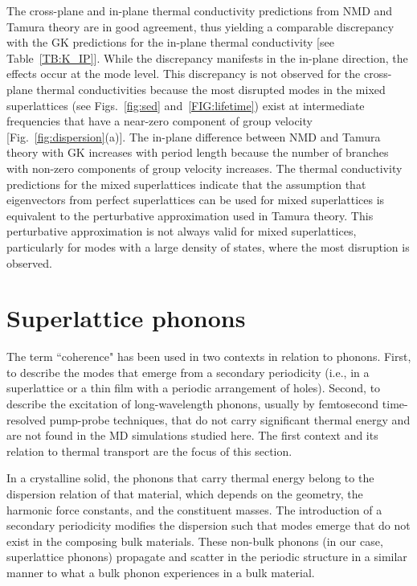 \documentclass[aps,prb,preprint,preprintnumbers,amsmath,amssymb,floatfix,superscriptaddress]{revtex4}
\begin{document}
The cross-plane and in-plane thermal conductivity predictions from NMD and Tamura theory are in good agreement, thus yielding a comparable discrepancy with the GK predictions for the in-plane thermal conductivity [see Table~\ref{TB:K_IP}]. While the discrepancy manifests in the in-plane direction, the effects occur at the mode level. This discrepancy is not observed for the cross-plane thermal conductivities because the most disrupted modes in the mixed superlattices (see Figs.~\ref{fig:sed} and~\ref{FIG:lifetime}) exist at intermediate frequencies that have a near-zero component of group velocity [Fig.~\ref{fig:dispersion}(a)]. The in-plane difference between NMD and Tamura theory with GK increases with period length because the number of branches with non-zero components of group velocity increases. The thermal conductivity predictions for the mixed superlattices indicate that the assumption that eigenvectors from perfect superlattices can be used for mixed superlattices is equivalent to the perturbative approximation used in Tamura theory. This perturbative approximation is not always valid for mixed superlattices, particularly for modes with a large density of states, where the most disruption is observed.

\section{Superlattice phonons}\label{SEC:sl_phon}
The term ``coherence" has been used in two contexts in relation to phonons. First, to describe the modes that emerge from a secondary periodicity (i.e., in a superlattice\cite{Luckyanova16112012}  or a thin film with a periodic arrangement of holes\cite{doi:10.1021/nl102918q,PhysRevB.87.195301}). Second, to describe the excitation of long-wavelength phonons, usually by femtosecond time-resolved pump-probe techniques,\cite{PhysRevLett.73.740,PhysRevB.75.195309} that do not carry significant thermal energy and are not found in the MD simulations studied here. The first context and its relation to thermal transport are the focus of this section.

In a crystalline solid, the phonons that carry thermal energy belong to the dispersion relation of that material, which depends on the geometry, the harmonic force constants, and the constituent masses. The introduction of a secondary periodicity modifies the dispersion such that modes emerge that do not exist in the composing bulk materials. These non-bulk phonons (in our case, superlattice phonons) propagate and scatter in the periodic structure in a similar manner to what a bulk phonon experiences in a bulk material. 
\end{document}

